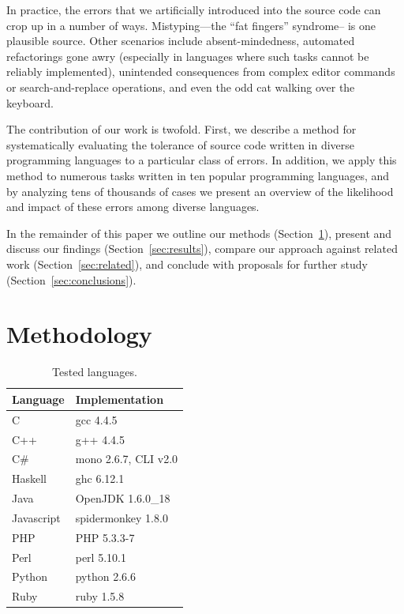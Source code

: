 \documentclass[10pt]{sigplanconf}
\begin{document}
In practice,
the errors that we artificially introduced into the source code can
crop up in a number of ways.
Mistyping---the ``fat fingers'' syndrome-- is one plausible source.
Other scenarios include
absent-mindedness,
automated refactorings gone awry
(especially in languages where such tasks cannot be reliably implemented),
unintended consequences from complex editor commands or
search-and-replace operations,
and even the odd cat walking over the keyboard.

The contribution of our work is twofold.
First, we describe a method for systematically evaluating the tolerance
of source code written in diverse programming languages to a particular
class of errors.
In addition, we apply this method to numerous tasks written in ten popular
programming languages,
and by analyzing tens of thousands of cases we present an overview of
the likelihood and impact of these errors among diverse languages.

In the remainder of this paper we
outline our methods (Section~\ref{sec:method}),
present and discuss our findings (Section~\ref{sec:results}),
compare our approach against related work (Section~\ref{sec:related}),
and conclude with proposals for further study (Section~\ref{sec:conclusions}).

\section{Methodology} %
\label{sec:method}

\begin{table}
\begin{center}
\begin{tabular}{ l l}
Language & Implementation \\
\hline
C 			& gcc 4.4.5 \\
C++ 		& g++ 4.4.5 \\
C\# 		& mono 2.6.7, CLI v2.0 \\
Haskell 	& ghc 6.12.1 \\
Java 		& OpenJDK 1.6.0\_18 \\
Javascript 	& spidermonkey 1.8.0 \\
PHP 		& PHP 5.3.3-7 \\
Perl 		& perl 5.10.1 \\
Python 		& python 2.6.6 \\
Ruby 		& ruby 1.5.8 \\
\end{tabular}
\end{center}
\caption{Tested languages.}
\label{tab:langs}
\end{table}
\end{document}
